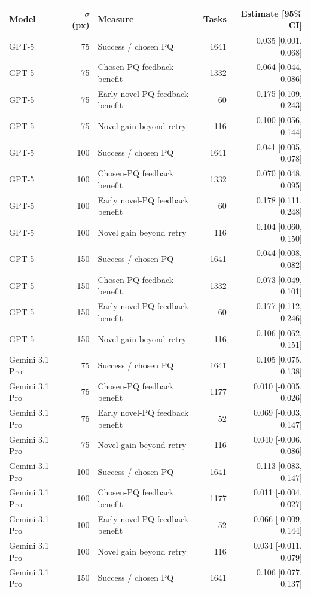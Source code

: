 \begin{tabular}{lrlrr}
\toprule
Model & $\sigma$ (px) & Measure & Tasks & Estimate [95\% CI] \\
\midrule
GPT-5 & 75 & Success / chosen PQ & 1641 & 0.035 [0.001, 0.068] \\
GPT-5 & 75 & Chosen-PQ feedback benefit & 1332 & 0.064 [0.044, 0.086] \\
GPT-5 & 75 & Early novel-PQ feedback benefit & 60 & 0.175 [0.109, 0.243] \\
GPT-5 & 75 & Novel gain beyond retry & 116 & 0.100 [0.056, 0.144] \\
GPT-5 & 100 & Success / chosen PQ & 1641 & 0.041 [0.005, 0.078] \\
GPT-5 & 100 & Chosen-PQ feedback benefit & 1332 & 0.070 [0.048, 0.095] \\
GPT-5 & 100 & Early novel-PQ feedback benefit & 60 & 0.178 [0.111, 0.248] \\
GPT-5 & 100 & Novel gain beyond retry & 116 & 0.104 [0.060, 0.150] \\
GPT-5 & 150 & Success / chosen PQ & 1641 & 0.044 [0.008, 0.082] \\
GPT-5 & 150 & Chosen-PQ feedback benefit & 1332 & 0.073 [0.049, 0.101] \\
GPT-5 & 150 & Early novel-PQ feedback benefit & 60 & 0.177 [0.112, 0.246] \\
GPT-5 & 150 & Novel gain beyond retry & 116 & 0.106 [0.062, 0.151] \\
Gemini 3.1 Pro & 75 & Success / chosen PQ & 1641 & 0.105 [0.075, 0.138] \\
Gemini 3.1 Pro & 75 & Chosen-PQ feedback benefit & 1177 & 0.010 [-0.005, 0.026] \\
Gemini 3.1 Pro & 75 & Early novel-PQ feedback benefit & 52 & 0.069 [-0.003, 0.147] \\
Gemini 3.1 Pro & 75 & Novel gain beyond retry & 116 & 0.040 [-0.006, 0.086] \\
Gemini 3.1 Pro & 100 & Success / chosen PQ & 1641 & 0.113 [0.083, 0.147] \\
Gemini 3.1 Pro & 100 & Chosen-PQ feedback benefit & 1177 & 0.011 [-0.004, 0.027] \\
Gemini 3.1 Pro & 100 & Early novel-PQ feedback benefit & 52 & 0.066 [-0.009, 0.144] \\
Gemini 3.1 Pro & 100 & Novel gain beyond retry & 116 & 0.034 [-0.011, 0.079] \\
Gemini 3.1 Pro & 150 & Success / chosen PQ & 1641 & 0.106 [0.077, 0.137] \\

\end{tabular}
